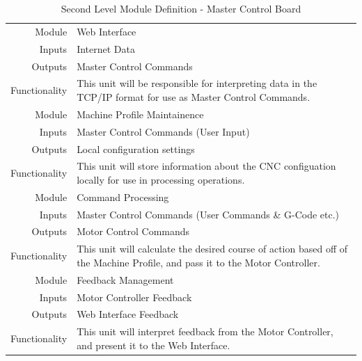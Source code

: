 \begin{table}[H] 
	\caption{Second Level Module Definition - Master Control Board}
	\label{table:secondlevelmaster}
	\centering 
	\begin{tabular}{|r p{10cm}|} 
		\hline\hline 
		Module		& Web Interface \\ 
		Inputs		& Internet Data	\\ 
		Outputs		& Master Control Commands \\ 
		Functionality	& This unit will be responsible for interpreting data in the TCP/IP format for use as Master Control Commands.\\ 
		\hline\hline 
		Module		& Machine Profile Maintainence \\ 
		Inputs		& Master Control Commands (User Input)\\ 
		Outputs		& Local configuration settings \\ 
		Functionality	& This unit will store information about the CNC configuation locally for use in processing operations.\\
		\hline\hline  
		Module		& Command Processing \\ 
		Inputs		& Master Control Commands (User Commands \& G-Code etc.) \\ 
		Outputs		& Motor Control Commands \\ 
		Functionality	& This unit will calculate the desired course of action based off of the Machine Profile, and pass it to the Motor Controller.\\
		\hline\hline 
		Module		& Feedback Management \\ 
		Inputs		& Motor Controller Feedback \\ 
		Outputs		& Web Interface Feedback \\ 
		Functionality	& This unit will interpret feedback from the Motor Controller, and present it to the Web Interface. \\
		\hline
		\end{tabular} 
\end{table}

